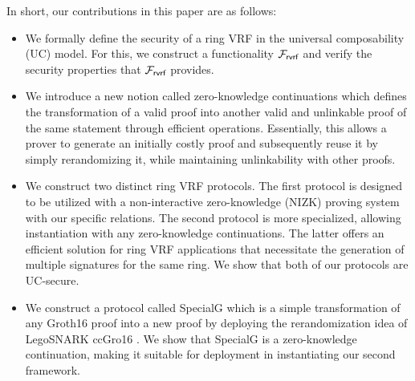 In short, our contributions in this paper are as follows:
 \begin{itemize}
 	\item We formally define the security of a ring VRF in the universal composability (UC) model. For this, we construct a functionality $ \mathcal{F}_{\textsf{rvrf}} $ and verify the security properties that $ \mathcal{F}_{\textsf{rvrf}} $ provides.
 	
 	\item We introduce a new notion called zero-knowledge continuations  which defines the transformation of a valid proof into another valid and unlinkable proof of the same statement through efficient operations. Essentially, this allows a prover to generate an initially costly proof and subsequently reuse it by simply rerandomizing it,  while maintaining unlinkability with other proofs. 
 	
 	\item We construct two distinct  ring VRF protocols. The first protocol is designed to be utilized with a non-interactive zero-knowledge (NIZK) proving system with our specific relations. The second protocol is more specialized, allowing instantiation with any zero-knowledge continuations. The latter offers an efficient solution for ring VRF applications that necessitate the generation of multiple signatures for the same ring. We show that both of our protocols are UC-secure.
 	
 	\item 	We construct a protocol called SpecialG  which  is a simple transformation of any Groth16 proof into a new proof by deploying the rerandomization idea of LegoSNARK ccGro16 \cite{LegoSNARK}. We show that SpecialG is a zero-knowledge continuation, making it suitable for deployment in instantiating our second framework.
 	 
  
 \end{itemize}
